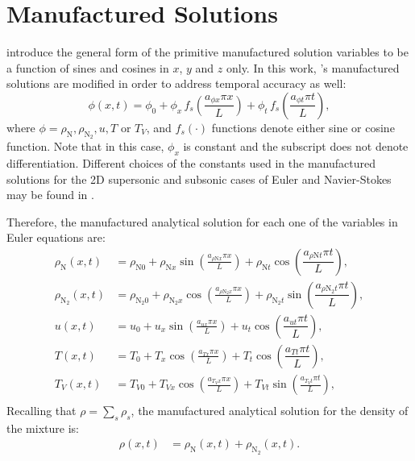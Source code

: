\documentclass[10pt]{article}
\begin{document}
\section{Manufactured Solutions}


\citet{Roy2002} introduce the general form of the primitive manufactured solution variables to be  a function of sines and cosines in $x$, $y$ and $z$ only. In this work, \citet{Roy2002}'s manufactured solutions are modified in order to address temporal accuracy as well:
\begin{equation}
 \label{eq:manufactured01}
 \phi (x,t) = \phi_0+ \phi_x\, f_s \left(\frac{a_{\phi x} \pi x}{L} \right)+ \phi_t \,f_s\left(\frac{a_{\phi t} \pi t}{L}\right),
\end{equation}
where $\phi=\rho_{\text{N}},\rho_{\text{N}_2}, u, T$ or $T_V$, and $f_s(\cdot)$ functions denote either sine or cosine function. Note that in this case, $\phi_x$ is constant and the subscript does not denote differentiation. Different choices of the constants used in the manufactured solutions for the 2D supersonic and subsonic cases of Euler and Navier-Stokes may be found in \citet{Roy2002}.

Therefore, the manufactured analytical solution for each one of the variables in Euler equations are:
\begin{equation}
\begin{split}
\label{eq:manufactured02}
\rho_{\text{N}}(x,t) &= \rho_{\text{N}0} + \rho_{\text{N}x} \sin\left(\frac{a_{  \rho \text{N} x }\pi x}{L}\right)+\rho_{\text{N}t} \cos\left( \dfrac{ a_{ \rho \text{N} t}  \pi t}{L}\right),\\
\rho_{\text{N}_2}(x,t) &= \rho_{\text{N}_2 0}+ \rho_{\text{N}_2 x} \cos\left(\frac{a_{ \rho \text{N}_2 x } \pi x}{L}\right)+\rho_{\text{N}_2 t} \sin\left( \dfrac{ a_{ \rho \text{N}_2 t}\pi t}{L}\right),\\
u(x,t) &= u_{0}+u_{x} \sin\left(\frac{a_{u x} \pi x}{L}\right)+ u_t \cos\left( \dfrac{ a_{ut}\pi t}{L}\right),\\
T(x,t) &= T_{0}+T_{x} \cos\left(\frac{a_{T x} \pi x}{L}\right)+ T_t \cos\left( \dfrac{ a_{Tt} \pi t}{L}\right),\\
T_V(x,t) &= T_{V0}+T_{Vx} \cos\left(\frac{a_{T_V x} \pi x}{L}\right)+T_{Vt}\sin\left(\frac{a_{T_V t} \pi t}{L}\right),\\
\end{split}
\end{equation}
Recalling that $\rho=\sum_s \rho_s$, the manufactured analytical solution for the density of the mixture  is:
\begin{equation}
\label{eq:manufactured03}
\begin{split}
\rho(x,t) &= \rho_{\text{N}}(x,t)+\rho_{\text{N}_2}(x,t).
\end{split}
\end{equation}
\end{document}
